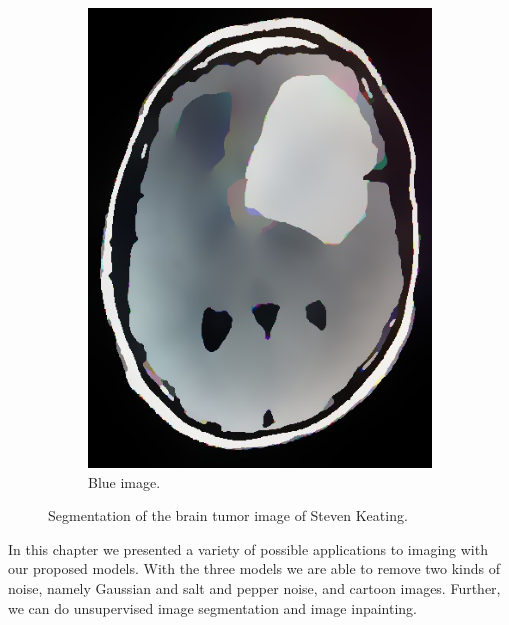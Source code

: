\documentclass[abstracton]{scrreprt}
\begin{document}
\begin{figure}[!ht]
\begin{subfigure}[b]{0.3\textwidth}
                    \includegraphics[width=\textwidth]{img/segmentation/rt/keating.jpg}
                    \caption{Blue image.}
                \end{subfigure}
                \caption[Image segmentation for a brain tumor image.]{Segmentation of the brain tumor image of Steven Keating.}
            \label{fig:segmentation_evolution_keating}
            \end{figure}

    In this chapter we presented a variety of possible applications to imaging with our proposed models. With the three models we are able to remove two kinds of noise, namely Gaussian and salt and pepper noise, and cartoon images. Further, we can do unsupervised image segmentation and image inpainting.
\end{document}
